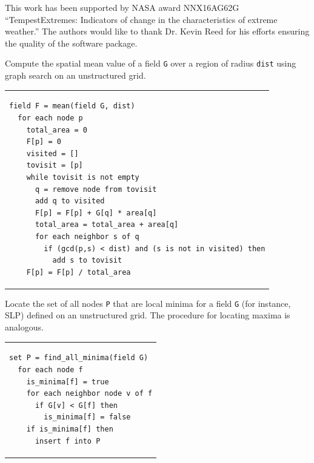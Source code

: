 \documentclass[gmdd, hvmath]{copernicus}
\begin{document}

\begin{acknowledgements}
This work has been supported by NASA award NNX16AG62G ``TempestExtremes: Indicators of change in the characteristics of extreme weather.''  The authors would like to thank Dr. Kevin Reed for his efforts ensuring the quality of the software package.
\end{acknowledgements}







\begin{algorithm}
\caption{Compute the spatial mean value of a field \texttt{G} over a region of radius \texttt{dist} using graph search on an unstructured grid.\ \\} \label{alg:field_mean_value}
\noindent \begin{tabular}{p{5in}}
\small \begin{verbatim}
field F = mean(field G, dist)
  for each node p
    total_area = 0
    F[p] = 0
    visited = []
    tovisit = [p]
    while tovisit is not empty
      q = remove node from tovisit
      add q to visited
      F[p] = F[p] + G[q] * area[q]
      total_area = total_area + area[q]
      for each neighbor s of q
        if (gcd(p,s) < dist) and (s is not in visited) then
          add s to tovisit
    F[p] = F[p] / total_area
\end{verbatim} \\
\end{tabular}
\end{algorithm}

\begin{algorithm}
\caption{Locate the set of all nodes \texttt{P} that are local minima for a field \texttt{G} (for instance, SLP) defined on an unstructured grid.  The procedure for locating maxima is analogous.\ \\} \label{alg:find_all_minima}
\noindent \begin{tabular}{p{5in}}
\small \begin{verbatim}
set P = find_all_minima(field G)
  for each node f
    is_minima[f] = true
    for each neighbor node v of f
      if G[v] < G[f] then
        is_minima[f] = false
    if is_minima[f] then
      insert f into P
\end{verbatim} \\
\end{tabular}
\end{algorithm}
\end{document}
